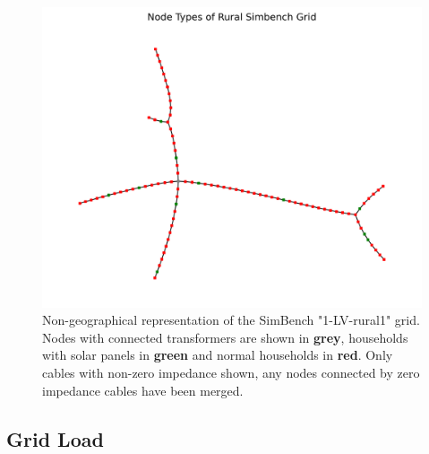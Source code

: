 \begin{figure}[h]
    \includegraphics{img/simbench/layout.png}
    \caption{
        Non-geographical representation of the SimBench "1-LV-rural1"
        grid\autocite{simbench}. Nodes with connected transformers are shown
        in \textbf{grey}, households with solar panels in \textbf{green}
        and normal households in \textbf{red}. Only cables with non-zero impedance shown, any nodes
        connected by zero impedance cables have been merged.
    }
    \label{fig:vep:simbench_node_types}
\end{figure}



\subsection{Grid Load}


